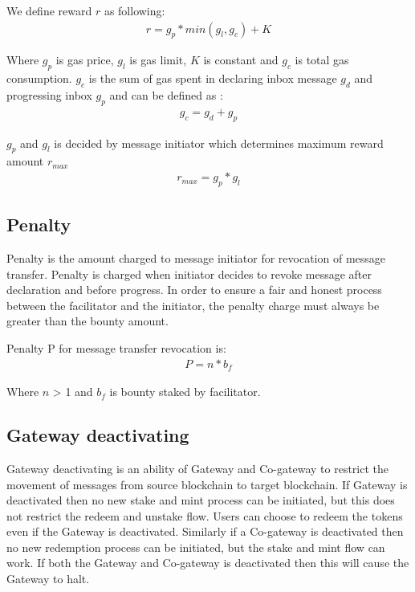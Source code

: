 \documentclass[12pt,a4paper]{article}
\begin{document}
We define reward $r$ as following:
 \begin{align}
 	r  = g_p  *  min(g_l, g_c) + K 
 \end{align}
                         
Where $g_p$ is gas price, $g_l$  is gas limit,  $K$ is constant and $g_c$  is total gas consumption. $g_c$ is the sum of gas spent in declaring inbox message $g_d$ and progressing inbox $g_p$ and can be defined as :
 \begin{align}
 	g_c  = g_d  + g_p
 \end{align}
                                     
$g_p$ and $g_l$ is decided by message initiator which determines maximum reward amount $r_{max}$
 \begin{align}
 	r_{max}  = g_p *  g_l
 \end{align}

\subsection{Penalty}\label{gateway:penalty}
Penalty is the amount charged to message initiator for revocation of message transfer. 
Penalty is charged when initiator decides to revoke message after declaration and before progress.  
In order to ensure a fair and honest process between the facilitator and the initiator, the penalty charge must always be greater than the bounty amount.  

Penalty P for message transfer revocation is:
 \begin{align}
 	P = n * b_f
 \end{align}
                                           
Where $n$ > 1  and $b_f$ is bounty staked by facilitator. 

\subsection{Gateway deactivating}\label{gateway:deactivating}
Gateway deactivating is an ability of Gateway and Co-gateway to restrict the movement of messages from source blockchain to target blockchain. 
If Gateway is deactivated then no new stake and mint process can be initiated, but this does not restrict the redeem and unstake flow. 
Users can choose to redeem the tokens even if the Gateway is deactivated. 
Similarly if a Co-gateway is deactivated then no new redemption process can be initiated, but the stake and mint flow can work. 
If both the Gateway and Co-gateway is deactivated then this will cause the Gateway to halt.
\end{document}
